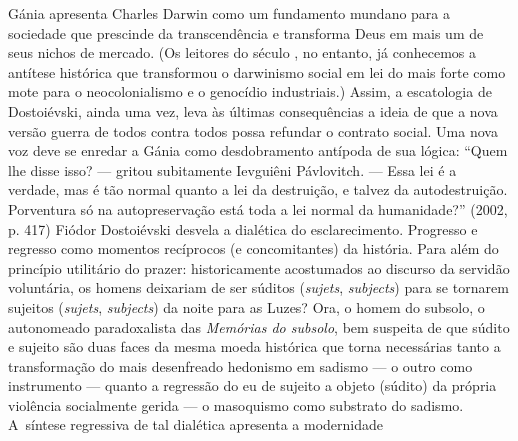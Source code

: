 Gánia apresenta Charles Darwin como um fundamento mundano para a
sociedade que prescinde da transcendência e transforma Deus em mais um
de seus nichos de mercado. (Os leitores do século , no entanto, já
conhecemos a antítese histórica que transformou o darwinismo social em
lei do mais forte como mote para o neocolonialismo e o genocídio
industriais.) Assim, a escatologia de Dostoiévski, ainda uma vez, leva
às últimas consequências a ideia de que a nova versão guerra de todos
contra todos possa refundar o contrato social. Uma nova voz deve se
enredar a Gánia como desdobramento antípoda de sua lógica: ``Quem lhe
disse isso? --- gritou subitamente Ievguiêni Pávlovitch. --- Essa lei é a
verdade, mas é tão normal quanto a lei da destruição, e talvez da
autodestruição. Porventura só na autopreservação está toda a lei normal
da humanidade?'' (2002, p. 417) Fiódor Dostoiévski desvela a dialética
do esclarecimento. Progresso e regresso como momentos recíprocos (e
concomitantes) da história. Para além do princípio utilitário do prazer:
historicamente acostumados ao discurso da servidão voluntária, os homens
deixariam de ser súditos (\emph{sujets}, \emph{subjects}) para se
tornarem sujeitos (\emph{sujets}, \emph{subjects}) da noite para as
Luzes? Ora, o homem do subsolo, o autonomeado paradoxalista das
\emph{Memórias do subsolo}, bem suspeita de que súdito e sujeito são
duas faces da mesma moeda histórica que torna necessárias tanto a
transformação do mais desenfreado hedonismo em sadismo --- o outro como
instrumento --- quanto a regressão do eu de sujeito a objeto (súdito) da
própria violência socialmente gerida --- o masoquismo como substrato do
sadismo. A~síntese regressiva de tal dialética apresenta a modernidade
